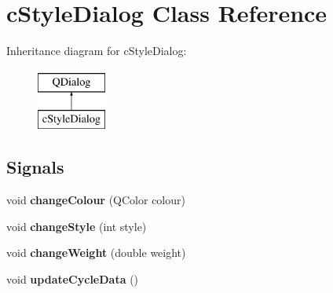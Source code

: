 \hypertarget{classc_style_dialog}{}\section{c\+Style\+Dialog Class Reference}
\label{classc_style_dialog}
Inheritance diagram for c\+Style\+Dialog\+:\begin{figure}[H]
\begin{center}
\leavevmode
\includegraphics[height=2.000000cm]{classc_style_dialog}
\end{center}
\end{figure}
\subsection*{Signals}
\begin{DoxyCompactItemize}
\item 
\mbox{\label{classc_style_dialog_af4fed4e11853816ab13e9b5ab8a1b6ed}} 
void {\bfseries change\+Colour} (Q\+Color colour)
\item 
\mbox{\label{classc_style_dialog_a170f46411ba76d9ba3ef97030ed9e1d8}} 
void {\bfseries change\+Style} (int style)
\item 
\mbox{\label{classc_style_dialog_a6e4b38f987018310b1a02189fcbf6dfc}} 
void {\bfseries change\+Weight} (double weight)
\item 
\mbox{\label{classc_style_dialog_a7915871fc0bbb02989bbd17f9071baf9}} 
void {\bfseries update\+Cycle\+Data} ()
\end{DoxyCompactItemize}
